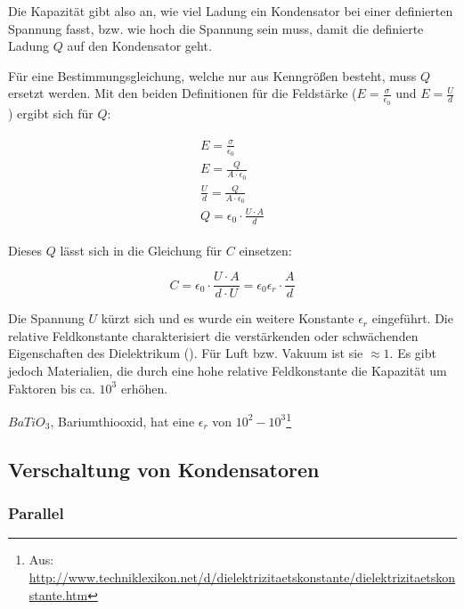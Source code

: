 Die Kapazität gibt also an, wie viel Ladung ein Kondensator bei einer definierten Spannung fasst, bzw. wie hoch die Spannung sein muss, damit die definierte Ladung $Q$ auf den Kondensator \glqq geht\grqq .

Für eine Bestimmungsgleichung, welche nur aus Kenngrößen besteht, muss $Q$ ersetzt werden. Mit den beiden Definitionen für die Feldstärke ($E = \frac{\sigma}{\epsilon_0}$ und $E=\frac{U}{d}$) ergibt sich für $Q$:

\begin{align}
\begin{split}
	E = \frac{\sigma}{\epsilon_0} \\
	E = \frac{Q}{A \cdot \epsilon_0} \\
	\frac{U}{d} = \frac{Q}{A \cdot \epsilon_0} \\
	Q = \epsilon_0 \cdot \frac{U \cdot A}{d}
\end{split}
\end{align}

\noindent Dieses $Q$ lässt sich in die Gleichung für $C$ einsetzen:

\begin{equation}
	C = \epsilon_0 \cdot \frac{U \cdot A}{d \cdot U} = \epsilon_0 \epsilon_r \cdot \frac{A}{d}
\end{equation}

Die Spannung $U$ kürzt sich und es wurde ein weitere Konstante $\epsilon_r$ eingeführt. Die \glqq relative Feldkonstante\grqq{} charakterisiert die verstärkenden oder schwächenden Eigenschaften des Dielektrikum (). Für Luft bzw. Vakuum ist sie $\approx 1$. Es gibt jedoch Materialien, die durch eine hohe relative Feldkonstante die Kapazität um Faktoren bis ca. $10^3$ erhöhen.

\begin{NiceToKnow}
$BaTiO_3$, Bariumthiooxid, hat eine $\epsilon_r$ von $10^2-10^3$\footnote{Aus: \url{http://www.techniklexikon.net/d/dielektrizitaetskonstante/dielektrizitaetskonstante.htm}}
\end{NiceToKnow}


\subsection{Verschaltung von Kondensatoren}

\subsubsection{Parallel}

